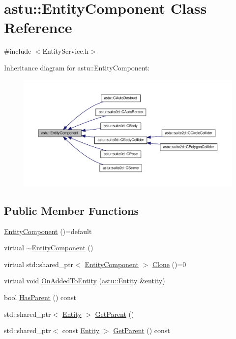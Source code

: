 \hypertarget{classastu_1_1EntityComponent}{}\section{astu\+:\+:Entity\+Component Class Reference}
\label{classastu_1_1EntityComponent}


{\ttfamily \#include $<$Entity\+Service.\+h$>$}



Inheritance diagram for astu\+:\+:Entity\+Component\+:
\nopagebreak
\begin{figure}[H]
\begin{center}
\leavevmode
\includegraphics[width=350pt]{classastu_1_1EntityComponent__inherit__graph}
\end{center}
\end{figure}
\subsection*{Public Member Functions}
\begin{DoxyCompactItemize}
\item 
\hyperlink{classastu_1_1EntityComponent_a9bb95d7ddc55093fd86e04d5b6aa98ec}{Entity\+Component} ()=default
\item 
virtual \hyperlink{classastu_1_1EntityComponent_a17295f763e201247c22bc677541646e5}{$\sim$\+Entity\+Component} ()
\item 
virtual std\+::shared\+\_\+ptr$<$ \hyperlink{classastu_1_1EntityComponent}{Entity\+Component} $>$ \hyperlink{classastu_1_1EntityComponent_afeddb5a899d831255a9a4f07269f3b2d}{Clone} ()=0
\item 
virtual void \hyperlink{classastu_1_1EntityComponent_a8736f12dc9d2be7d2569408fc1040480}{On\+Added\+To\+Entity} (\hyperlink{classastu_1_1Entity}{astu\+::\+Entity} \&entity)
\item 
bool \hyperlink{classastu_1_1EntityComponent_a84f03e175444f5ca650775fb89963925}{Has\+Parent} () const
\item 
std\+::shared\+\_\+ptr$<$ \hyperlink{classastu_1_1Entity}{Entity} $>$ \hyperlink{classastu_1_1EntityComponent_ae3c2dc735241902588358b933a786603}{Get\+Parent} ()
\item 
std\+::shared\+\_\+ptr$<$ const \hyperlink{classastu_1_1Entity}{Entity} $>$ \hyperlink{classastu_1_1EntityComponent_a33a590990c23ca5bfa8d555b526d7a39}{Get\+Parent} () const
\end{DoxyCompactItemize}
